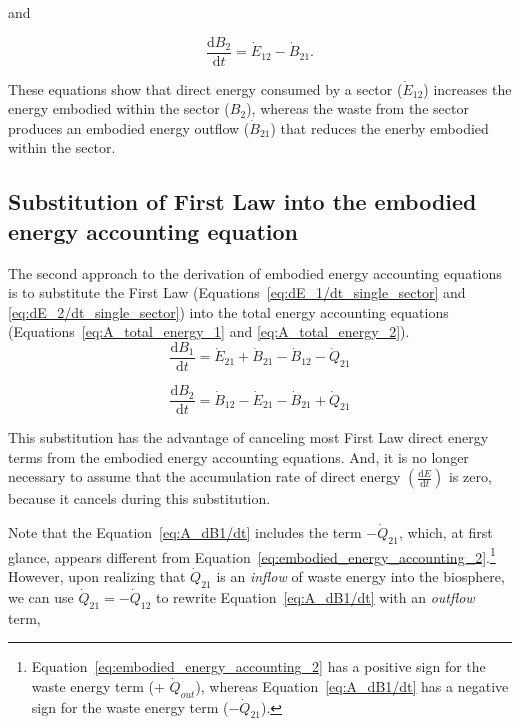\noindent and

\begin{equation} \label{eq:A_total_energy_2_simp}
	\frac{\mathrm{d}B_{2}}{\mathrm{d}t} 
	= \dot{E}_{12} 
	- \dot{B}_{21}.	
\end{equation}

These equations show that direct energy consumed by a 
sector ($\dot{E}_{12}$) increases the energy embodied within the sector ($B_2$), 
whereas the waste from the sector produces an embodied
energy outflow ($\dot{B}_{21}$) that reduces the enerby embodied within the sector. 



\subsection{Substitution of First Law into the embodied energy accounting equation} %
\label{sec:A_first_law_embodied}

The second approach to the derivation of embodied energy
accounting equations is to substitute the First Law
(Equations~\ref{eq:dE_1/dt_single_sector} and \ref{eq:dE_2/dt_single_sector}) 
into the total energy accounting equations 
(Equations~\ref{eq:A_total_energy_1} and \ref{eq:A_total_energy_2}). 
\begin{equation} \label{eq:A_dB1/dt}
	\frac{\mathrm{d}B_{1}}{\mathrm{d}t} 
	= \dot{E}_{21}
	+ \dot{B}_{21} 
	- \dot{B}_{12}
	- \dot{Q}_{21}
\end{equation}

\begin{equation} \label{eq:A_dB2/dt}
	\frac{\mathrm{d}B_{2}}{\mathrm{d}t} 
	= \dot{B}_{12} 
	- \dot{E}_{21}
	- \dot{B}_{21}
	+ \dot{Q}_{21}
\end{equation}

This substitution has the advantage of canceling most 
First Law direct energy terms from the embodied energy accounting equations.
And, it is no longer necessary to assume that the 
accumulation rate of direct energy 
$\left( \frac{\mathrm{d}E}{\mathrm{d}t} \right)$
is zero, because it cancels during this substitution.

Note that the Equation~\ref{eq:A_dB1/dt} includes the
term $-\dot{Q}_{21}$, which, at first glance,
appears different from 
Equation~\ref{eq:embodied_energy_accounting_2}.\footnote{Equation~\ref{eq:embodied_energy_accounting_2}
has a positive sign for the waste energy term (+ $\dot{Q}_{out}$),
whereas Equation~\ref{eq:A_dB1/dt} has a 
negative sign for the waste energy term ($- \dot{Q}_{21}$).}
However, upon realizing that $\dot{Q}_{21}$ is an \emph{inflow}
of waste energy into the biosphere, we can use $\dot{Q}_{21} = - \dot{Q}_{12}$
to rewrite Equation~\ref{eq:A_dB1/dt} with an \emph{outflow} 
term,

